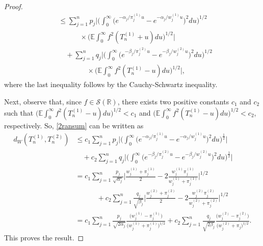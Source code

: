 \documentclass[12pt, a4paper,reqno]{amsart}
\theoremstyle{definition}
\theoremstyle{myremark}
\numberwithin{equation}{section}
\begin{document}
\begin{proof}
\begin{align}
 		\nonumber &\leq\sum_{j=1}^{n}p_j \bigg|\bigg(\int_{0}^{\infty}\bigg(e^{-\alpha_j/\pi_{j}^{(1)} u}-e^{-\alpha_j/w_{j}^{(1)} u}\bigg)^2 du\bigg)^{1/2}\\
 		\nonumber&\quad\quad\quad \times
\bigg(\mathbb{E}\displaystyle\int_{0}^{\infty}f^{2}(T_n^{(1)}+u)du\bigg)^{1/2}\bigg|\\
\nonumber&\quad+\sum_{j=1}^{n}q_j \bigg|\bigg(\int_{0}^{\infty}\bigg(e^{-\beta_j/\pi_{j}^{(2)} u}-e^{-\beta_j/w_{j}^{(2)} u}\bigg)^2 du\bigg)^{1/2}\\
&\quad\quad\quad\quad\times
\bigg(\mathbb{E}\displaystyle\int_{0}^{\infty}f^{2}(T_n^{(1)}-u)du\bigg)^{1/2}\bigg|,
 \end{align}
 \noindent
 where the last inequality follows by the Cauchy-Schwartz inequality.
 
  Next, observe that, since $f\in\mathcal{S}(\mathbb{R})$, there exists two positive constants $c_1$ and $c_2$ such that $\bigg(\mathbb{E}\displaystyle\int_{0}^{\infty}f^{2}(T_n^{(1)}-u)du\bigg)^{1/2}<c_1$ and $\bigg(\mathbb{E}\displaystyle\int_{0}^{\infty}f^{2}(T_n^{(1)}-u)du\bigg)^{1/2}<c_2$, respectively. So, \eqref{2ransum} can be written as
 \begin{align*}
 d_W(T_n^{(1)},T_n^{(2)})& \leq c_1 \sum_{j=1}^{n}p_j \bigg|\bigg(\int_{0}^{\infty}\bigg(e^{-\alpha_j/\pi_{j}^{(1)} u}-e^{-\alpha_j/w_{j}^{(1)} u}\bigg)^2 du\bigg)^{\frac{1}{2}}\bigg|\\
 &\quad+c_2\sum_{j=1}^{n}q_j \bigg|\bigg(\int_{0}^{\infty}\bigg(e^{-\beta_j/\pi_{j}^{(2)} u}-e^{-\beta_j/w_{j}^{(2)} u}\bigg)^2 du\bigg)^{\frac{1}{2}}\bigg|\\
 &=c_1 \sum_{j=1}^{n}\frac{p_j}{\sqrt{\alpha_j}}\bigg|\frac{w_j^{(1)} + \pi_{j}^{(1)}}{2}-2\frac{w_j^{(1)}\pi_{j}^{(1)} }{w_j^{(1)}+\pi_{j}^{(1)}}  \bigg|^{1/2}\\
 &\quad\quad\quad + c_2\sum_{j=1}^{n}\frac{q_j}{\sqrt{\beta_j}}\bigg|\frac{w_j^{(2)}+\pi_{j}^{(2)}}{2}-2\frac{w_j^{(2)}\pi_{j}^{(2)} }{w_j^{(2)}+\pi_{j}^{(2)}}  \bigg|^{1/2}\\
 &=c_1 \sum_{j=1}^{n}\frac{p_j}{\sqrt{2\alpha_j}} \frac{ \big(w_j^{(1)} - \pi_{j}^{(1)}\big) }{\big(w_j^{(1)} + \pi_{j}^{(1)}\big)^{1/2}}+c_2\sum_{j=1}^{n}\frac{q_j}{\sqrt{2\beta_j}}\frac{\big(w_j^{(2)}-\pi_{j}^{(2)}\big)}{\big(w_j^{(2)}+\pi_{j}\big)^{1/2}}.
 \end{align*}
 This proves the result.	
 \end{proof}
\end{document}
